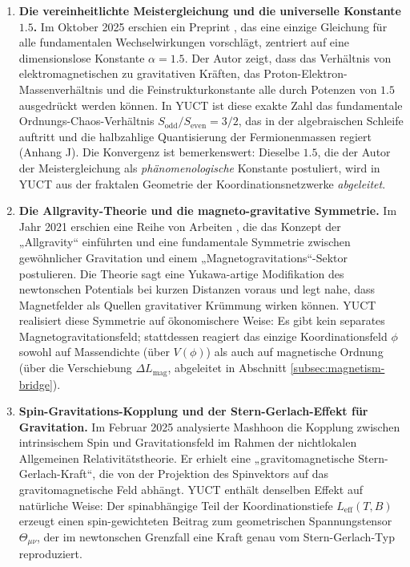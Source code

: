 \documentclass[12pt]{article}
\theoremstyle{remark}
\begin{document}
	\begin{enumerate}
		
		\item \textbf{Die vereinheitlichte Meistergleichung und die universelle Konstante $1.5$.}
		Im Oktober 2025 erschien ein Preprint \cite{UnifiedMaster2025}, das eine einzige
		Gleichung für alle fundamentalen Wechselwirkungen vorschlägt, zentriert auf eine dimensionslose Konstante
		$\alpha = 1.5$.  Der Autor zeigt, dass das Verhältnis von elektromagnetischen zu
		gravitativen Kräften, das Proton-Elektron-Massenverhältnis und die Feinstrukturkonstante
		alle durch Potenzen von $1.5$ ausgedrückt werden können.
		In YUCT ist diese exakte Zahl das fundamentale Ordnungs-Chaos-Verhältnis
		$S_{\mathrm{odd}}/S_{\mathrm{even}} = 3/2$, das in der algebraischen Schleife auftritt
		und die halbzahlige Quantisierung der Fermionenmassen regiert (Anhang J).
		Die Konvergenz ist bemerkenswert: Dieselbe $1.5$, die der Autor der Meistergleichung
		als \emph{phänomenologische} Konstante postuliert, wird in YUCT aus der fraktalen Geometrie
		der Koordinationsnetzwerke \emph{abgeleitet}.
		
		\item \textbf{Die Allgravity-Theorie und die magneto-gravitative Symmetrie.}
		Im Jahr 2021 erschien eine Reihe von Arbeiten \cite{Allgravity2021}, die das Konzept
		der „Allgravity“ einführten und eine fundamentale Symmetrie zwischen gewöhnlicher Gravitation und einem
		„Magnetogravitations“-Sektor postulieren.  Die Theorie sagt eine Yukawa-artige Modifikation
		des newtonschen Potentials bei kurzen Distanzen voraus und legt nahe, dass Magnetfelder
		als Quellen gravitativer Krümmung wirken können.
		YUCT realisiert diese Symmetrie auf ökonomischere Weise: Es gibt kein separates
		Magnetogravitationsfeld; stattdessen reagiert das einzige Koordinationsfeld $\phi$ sowohl
		auf Massendichte (über $V(\phi)$) als auch auf magnetische Ordnung (über die Verschiebung
		$\Delta L_{\mathrm{mag}}$, abgeleitet in Abschnitt \ref{subsec:magnetism-bridge}).
		
		\item \textbf{Spin-Gravitations-Kopplung und der Stern-Gerlach-Effekt für Gravitation.}
		Im Februar 2025 analysierte Mashhoon \cite{Mashhoon2025} die Kopplung zwischen intrinsischem
		Spin und Gravitationsfeld im Rahmen der nichtlokalen Allgemeinen Relativitätstheorie.
		Er erhielt eine „gravitomagnetische Stern-Gerlach-Kraft“, die von der Projektion des Spinvektors
		auf das gravitomagnetische Feld abhängt.  YUCT enthält denselben Effekt auf natürliche Weise:
		Der spinabhängige Teil der Koordinationstiefe $L_{\mathrm{eff}}(T,B)$ erzeugt einen
		spin-gewichteten Beitrag zum geometrischen Spannungstensor $\Theta_{\mu\nu}$, der im
		newtonschen Grenzfall eine Kraft genau vom Stern-Gerlach-Typ reproduziert.
		

\end{enumerate}
\end{document}
